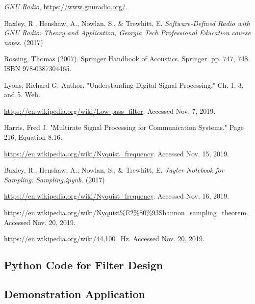 \begin{thebibliography}{1}

\emph{GNU Radio}, \url{https://www.gnuradio.org/}.

 Baxley, R., Henshaw, A., Nowlan, S., \&
Trewhitt, E. \emph{Software-Defined Radio with GNU Radio: Theory
and Application, Georgia Tech Professional Education course
notes.} (2017)

 Rossing, Thomas (2007). Springer Handbook of
Acoustics. Springer. pp. 747, 748. ISBN 978-0387304465.

 Lyons, Richard G. Author. "Understanding
Digital Signal Processing." Ch. 1, 3, and 5. Web.

\url{https://en.wikipedia.org/wiki/Low-pass_filter}. Accessed
Nov. 7, 2019.

 Harris, Fred J. "Multirate Signal Processing
for Communication Systems." Page 216, Equation 8.16.

\url{https://en.wikipedia.org/wiki/Nyquist_frequency}. Accessed
Nov. 15, 2019.

 Baxley, R., Henshaw, A., Nowlan, S.,
\& Trewhitt, E. \emph{Juyter Notebook for Sampling:
Sampling.ipynb.} (2017)

\url{https://en.wikipedia.org/wiki/Nyquist_frequency}. Accessed
Nov. 16, 2019.

\url{https://en.wikipedia.org/wiki/Nyquist\%E2\%80\%93Shannon_sampling_theorem}.
Accessed Nov. 20, 2019.

 \url{https://en.wikipedia.org/wiki/44,100_Hz}.
Accessed Nov. 20, 2019.

\end{thebibliography}

\newpage

\onecolumn 
\appendix 

\subsection{Python Code for Filter Design\cite{notes:class}}


\newpage
\subsection{Demonstration Application}





